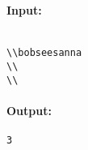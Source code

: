 \paragraph{\textbf{    Input:   }}
\begin{verbatim}

\\bobseesanna
\\
\\\end{verbatim}

\paragraph{   Output:  }
\begin{verbatim}
3\end{verbatim}